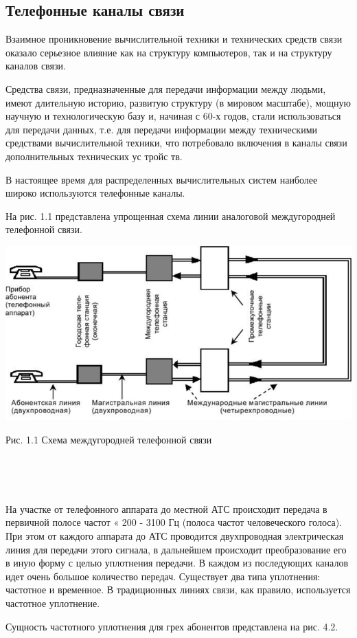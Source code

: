 \documentclass[a4paper]{report}
\begin{document}
\subsection{Телефонные каналы связи}

Взаимное проникновение вычислительной техники и технических средств связи оказало серьезное влияние как на структуру компьютеров, так и на структуру каналов связи.

Средства связи, предназначенные для передачи информации между людьми, имеют длительную историю, развитую структуру (в мировом масштабе), мощную научную и технологическую базу и, начиная с 60-х годов, стали использоваться для передачи данных, т.е. для передачи информации между техническими средствами вычислительной техники, что потребовало включения в каналы связи дополнительных технических ус тройс тв.

В настоящее время для распределенных вычислительных систем наиболее широко используются телефонные каналы.

На рис. 1.1 представлена упрощенная схема линии аналоговой междугородней телефонной связи.

\includegraphics[scale=1.4]{66}
{\centering\caption{Рис. 1.1 Схема междугородней телефонной связи}\\}
~

На участке от телефонного аппарата до местной АТС происходит передача в первичной полосе частот « 200 - 3100 Гц (полоса частот человеческого голоса). При этом от каждого аппарата до АТС проводится двухпроводная электрическая линия для передачи этого сигнала, в дальнейшем происходит преобразование его в иную форму с целью уплотнения передачи. В каждом из последующих каналов идет очень большое количество передач. Существует два типа уплотнения: частотное и временное. В традиционных линиях связи, как правило, используется частотное уплотнение.

Сущность частотного уплотнения для грех абонентов представлена на рис. 4.2.
\end{document}
